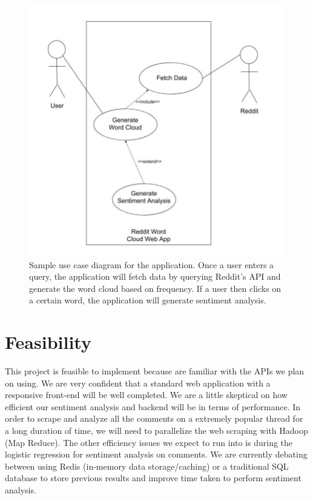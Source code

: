 \documentclass[11pt]{article}
\begin{document}
 \begin{figure}[H]
 	\centering
 	 \includegraphics[scale=0.6]{use_case}
 	\caption{Sample use case diagram for the application. Once a user enters a query, the application will fetch data by querying Reddit’s API and generate the word cloud based on frequency. If a user then clicks on a certain word, the application will generate sentiment analysis.}
 \end{figure}
 
\section{Feasibility}
\tab This project is feasible to implement because are familiar with the APIs we plan on using. We are very confident that a standard web application with a responsive front-end will be well completed. We are a little skeptical on how efficient our sentiment analysis and backend will be in terms of performance. In order to scrape and analyze all the comments on a extremely popular thread for a long duration of time, we will need to parallelize the web scraping with Hadoop (Map Reduce). The other efficiency issues we expect to run into is during the logistic regression for sentiment analysis on comments. We are currently debating between using Redis (in-memory data storage/caching) or a traditional SQL database to store previous results and improve time taken to perform sentiment analysis.
\end{document}
